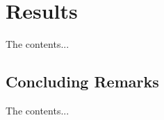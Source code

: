 %
%

\chapter{Results} %
\label{chap:results}

The contents...

%
%

\section{Concluding Remarks}
The contents...